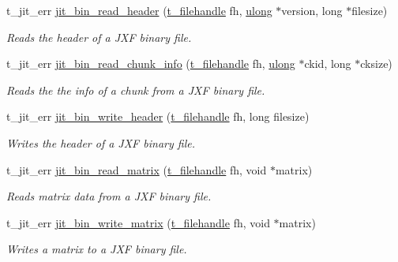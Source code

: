 \begin{DoxyCompactItemize}
\item 
t\_\-jit\_\-err \hyperlink{group__binmod_gae7d8bcde80fd16666ab01a841f0f23b2}{jit\_\-bin\_\-read\_\-header} (\hyperlink{group__files_gafcb776aa74d514754e83b30995b5a5d1}{t\_\-filehandle} fh, \hyperlink{group__datatypes_ga718b4eb2652c286f4d42dc18a8e71a1a}{ulong} $\ast$version, long $\ast$filesize)
\begin{DoxyCompactList}\small\item\em Reads the header of a JXF binary file. \item\end{DoxyCompactList}\item 
t\_\-jit\_\-err \hyperlink{group__binmod_ga8621d6d19ee0e6f5aa1af98002f533c4}{jit\_\-bin\_\-read\_\-chunk\_\-info} (\hyperlink{group__files_gafcb776aa74d514754e83b30995b5a5d1}{t\_\-filehandle} fh, \hyperlink{group__datatypes_ga718b4eb2652c286f4d42dc18a8e71a1a}{ulong} $\ast$ckid, long $\ast$cksize)
\begin{DoxyCompactList}\small\item\em Reads the the info of a chunk from a JXF binary file. \item\end{DoxyCompactList}\item 
t\_\-jit\_\-err \hyperlink{group__binmod_ga01de67893378a46116aef0fbb36b5b33}{jit\_\-bin\_\-write\_\-header} (\hyperlink{group__files_gafcb776aa74d514754e83b30995b5a5d1}{t\_\-filehandle} fh, long filesize)
\begin{DoxyCompactList}\small\item\em Writes the header of a JXF binary file. \item\end{DoxyCompactList}\item 
t\_\-jit\_\-err \hyperlink{group__binmod_gae1bd457360f302d87be427c0bcf76b9d}{jit\_\-bin\_\-read\_\-matrix} (\hyperlink{group__files_gafcb776aa74d514754e83b30995b5a5d1}{t\_\-filehandle} fh, void $\ast$matrix)
\begin{DoxyCompactList}\small\item\em Reads matrix data from a JXF binary file. \item\end{DoxyCompactList}\item 
t\_\-jit\_\-err \hyperlink{group__binmod_ga8102ed7929a540a5584505049870887a}{jit\_\-bin\_\-write\_\-matrix} (\hyperlink{group__files_gafcb776aa74d514754e83b30995b5a5d1}{t\_\-filehandle} fh, void $\ast$matrix)
\begin{DoxyCompactList}\small\item\em Writes a matrix to a JXF binary file. \item\end{DoxyCompactList}\end{DoxyCompactItemize}


